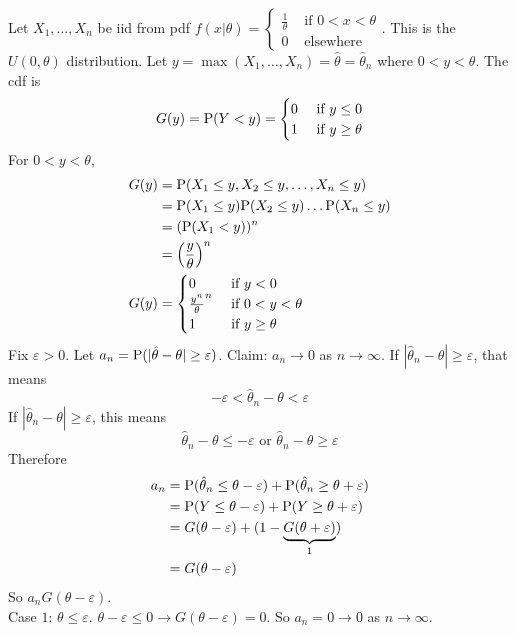 \documentclass[12pt]{article}
\begin{document}
Let $X_1,\dots,X_n$ be iid from pdf $f(x|\theta) = \begin{cases} \frac{1}{\theta} &\text{ if } 0 < x < \theta \\ 0 &\text{ elsewhere }\end{cases} $. This is the $U(0,\theta)$ distribution. Let $y = \max(X_1,\dots,X_n) = \hat{\theta} = \hat{\theta}_n$ where $0 < y < \theta$. The cdf is 
$$G(y) = \mathrm{P}( Y < y ) = \begin{cases} 0 &\text{ if } y \leq 0 \\ 1 &\text{ if } y \geq \theta \end{cases} $$ 
For $0 < y < \theta$, $$ \begin{aligned} G(y) &= \mathrm{P}( X_1 \leq y, X_2 \leq y, \dots, X_n \leq y ) \\ &= \mathrm{P}( X_1 \leq y )\mathrm{P}( X_2 \leq y ) \dots \mathrm{P}( X_n \leq y ) \\ &= (\mathrm{P}( X_1 < y ))^n \\ &= \Big( \frac{y}{\theta}\Big)^n \\ G(y) &= \begin{cases} 0 &\text{ if } y < 0 \\ \frac{y^n}{\theta}^n &\text{ if } 0 < y < \theta \\ 1 &\text{ if } y \geq \theta \end{cases} \end{aligned} $$ 
Fix $\varepsilon > 0$. Let $a_n = \mathrm{P}( |\hat{\theta} - \theta| \geq \varepsilon )$. Claim: $a_n \to 0$ as $n\to\infty$. If $|\hat{\theta}_n - \theta| \geq \varepsilon$, that means $$-\varepsilon < \hat{\theta}_n - \theta < \varepsilon$$ If $|\hat{\theta}_n - \theta| \geq \varepsilon$, this means $$ \hat{\theta}_n - \theta \leq -\varepsilon \text{ or } \hat{\theta}_n - \theta \geq \varepsilon$$ 
Therefore $$ \begin{aligned} a_n &= \mathrm{P}( \hat{\theta}_n \leq \theta - \varepsilon ) + \mathrm{P}( \hat{\theta}_n \geq \theta + \varepsilon ) \\ &= \mathrm{P}( Y \leq \theta - \varepsilon ) + \mathrm{P}( Y \geq \theta + \varepsilon ) \\ &= G(\theta - \varepsilon) + (1 - \underbrace{G(\theta+\varepsilon)}_1) \\ &= G(\theta -\varepsilon) \end{aligned}$$ 
So $a_n G(\theta -\varepsilon)$. \\
Case $1$: $\theta \leq \varepsilon$. $\theta - \varepsilon \leq 0 \to G(\theta - \varepsilon)  = 0$. So $a_n = 0 \to 0$ as $n \to \infty$. \\
\end{document}

